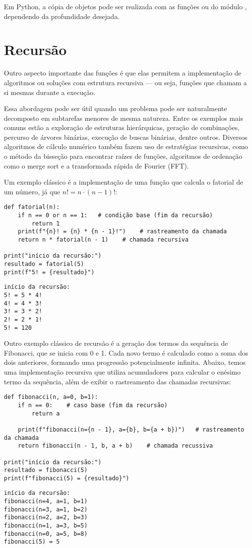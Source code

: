 Em Python, a cópia de objetos pode ser realizada com as funções  ou  do módulo
, dependendo da profundidade desejada.



\section{Recursão}

Outro aspecto importante das funções é que elas permitem a implementação de algoritmos ou soluções com estrutura
recursiva --- ou seja, funções que chamam a si mesmas durante a execução.

Essa abordagem pode ser útil quando um problema pode ser naturalmente decomposto em subtarefas menores de mesma
natureza.
Entre os exemplos mais comuns estão a exploração de estruturas hierárquicas, geração de combinações, percurso de
árvores binárias, execução de buscas binárias, dentre outros.
Diversos algoritmos de cálculo numérico também fazem uso de estratégias recursivas, como o método da bisseção para
encontrar raízes de funções, algoritmos de ordenação como o merge sort e a transformada rápida de Fourier (FFT).

Um exemplo clássico é a implementação de uma função que calcula o fatorial de um número, já que $n! = n \cdot (n-1)!$:
\begin{verbatim}
def fatorial(n):
    if n == 0 or n == 1:   # condição base (fim da recursão)
        return 1
    print(f"{n}! = {n} * {n - 1}!")    # rastreamento da chamada
    return n * fatorial(n - 1)    # chamada recursiva

print("início da recursão:")
resultado = fatorial(5)
print(f"5! = {resultado}")
\end{verbatim}
\begin{verbatim}
início da recursão:
5! = 5 * 4!
4! = 4 * 3!
3! = 3 * 2!
2! = 2 * 1!
5! = 120
\end{verbatim}

Outro exemplo clássico de recursão é a geração dos termos da sequência de Fibonacci, que se inicia com 0 e 1.
Cada novo termo é calculado como a soma dos dois anteriores, formando uma progressão potencialmente infinita.
Abaixo, temos uma implementação recursiva que utiliza acumuladores para calcular o enésimo termo da sequência,
além de exibir o rastreamento das chamadas recursivas:
\begin{verbatim}
def fibonacci(n, a=0, b=1):
    if n == 0:    # caso base (fim da recursão)
        return a

    print(f"fibonacci(n={n - 1}, a={b}, b={a + b})")   # rastreamento da chamada
    return fibonacci(n - 1, b, a + b)    # chamada recussiva

print("início da recursão:")
resultado = fibonacci(5)
print(f"fibonacci(5) = {resultado}")
\end{verbatim}
\begin{verbatim}
início da recursão:
fibonacci(n=4, a=1, b=1)
fibonacci(n=3, a=1, b=2)
fibonacci(n=2, a=2, b=3)
fibonacci(n=1, a=3, b=5)
fibonacci(n=0, a=5, b=8)
fibonacci(5) = 5
\end{verbatim}

